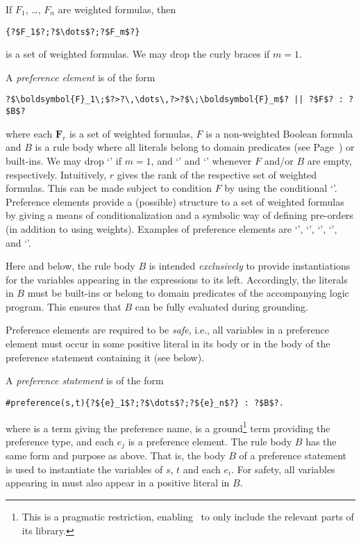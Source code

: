 If $F_1$, \ldots, $F_n$ are weighted formulas, then
\begin{lstlisting}[numbers=none,escapechar=?]
{?$F_1$?;?$\dots$?;?$F_m$?}
\end{lstlisting}
is a set of weighted formulas.
We may drop the curly braces if $m=1$.

A \emph{preference element} is of the form
\begin{lstlisting}[numbers=none,escapechar=?]
?$\boldsymbol{F}_1\;$?>?\,\dots\,?>?$\;\boldsymbol{F}_m$? || ?$F$? : ?$B$?
\end{lstlisting}
where each $\boldsymbol{F}_r$ is a set of weighted formulas, 
$F$ is a non-weighted Boolean formula
and $B$ is a rule body where all literals belong to domain predicates
(see Page~\pageref{pg:domain}) or built-ins.
%
We may drop `\code{>}' if $m=1$, 
and `' and `' whenever $F$ and/or $B$ are empty, respectively.
%
Intuitively, $r$ gives the rank of the respective set of weighted formulas.
This can be made subject to condition $F$ by using the conditional `\code{||}'.
Preference elements provide a (possible) structure to a set of weighted formulas
by giving a means of conditionalization and a symbolic way of defining pre-orders (in addition to using weights).
%
%
Examples of preference elements are 
`', 
`',  
`', 
`',  and
`'.

\begin{note}
Here and below, 
the rule body $B$ is intended \emph{exclusively} to provide instantiations for the variables appearing in the expressions to its left.  
Accordingly, the literals in $B$ must be built-ins or belong to domain predicates of the accompanying logic program.
This ensures that $B$ can be fully evaluated during grounding.
\end{note}

\begin{note}
Preference elements are required to be \emph{safe}, 
i.e., all variables in a preference element must occur in some positive literal 
in its body or in the body of the preference statement containing it (see below).  
\end{note} 

A \emph{preference statement} is of the form %
\begin{lstlisting}[numbers=none,escapechar=?]
#preference(s,t){?${e}_1$?;?$\dots$?;?${e}_n$?} : ?$B$?.
\end{lstlisting}
%
where  is a term giving the preference name, 
 is a ground\footnote{This is a pragmatic restriction,
enabling \asprin\ to only include the relevant parts of its library.} 
term providing the preference type, 
and each $e_j$ is a preference element.
The rule body $B$ has the same form and purpose as above.
%
That is, the body $B$ of a preference statement is used to instantiate the variables of $s$, $t$ and each $e_i$.
For safety, all variables appearing in  must also appear in a positive literal in $B$.

